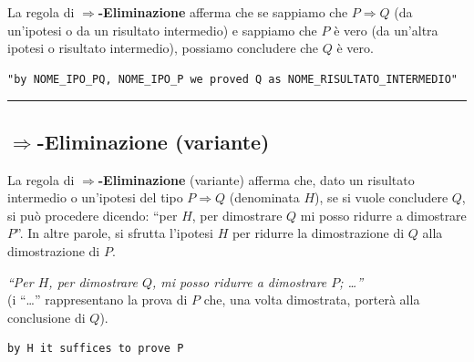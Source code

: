 \documentclass[
  a4paper,
]{article}
\begin{document}
La regola di \textbf{\(\Rightarrow\)-Eliminazione} afferma che se
sappiamo che \(P \Rightarrow Q\) (da un'ipotesi o da un risultato
intermedio) e sappiamo che \(P\) è vero (da un'altra ipotesi o risultato
intermedio), possiamo concludere che \(Q\) è vero.

\begin{examplebox}

\begin{lstlisting}
"by NOME_IPO_PQ, NOME_IPO_P we proved Q as NOME_RISULTATO_INTERMEDIO"
\end{lstlisting}

\end{examplebox}

\par\noindent\rule{\linewidth}{0.4pt}\par\vspace{6pt}

\hypertarget{rightarrow-eliminazione-variante}{%
\subsection{\texorpdfstring{\(\Rightarrow\)-Eliminazione
(variante)}{\textbackslash Rightarrow-Eliminazione (variante)}}\label{rightarrow-eliminazione-variante}}

La regola di \textbf{\(\Rightarrow\)-Eliminazione} (variante) afferma
che, dato un risultato intermedio o un'ipotesi del tipo
\(P \Rightarrow Q\) (denominata \(H\)), se si vuole concludere \(Q\), si
può procedere dicendo: ``per \(H\), per dimostrare \(Q\) mi posso
ridurre a dimostrare \(P\)''. In altre parole, si sfrutta l'ipotesi
\(H\) per ridurre la dimostrazione di \(Q\) alla dimostrazione di \(P\).

\begin{examplebox}[Esempio]

\emph{``Per \(H\), per dimostrare \(Q\), mi posso ridurre a dimostrare
\(P\); \ldots{}''}\\
(i ``\ldots{}'' rappresentano la prova di \(P\) che, una volta
dimostrata, porterà alla conclusione di \(Q\)).

\end{examplebox}

\begin{examplebox}

\begin{lstlisting}
by H it suffices to prove P
\end{lstlisting}

\end{examplebox}
\end{document}
